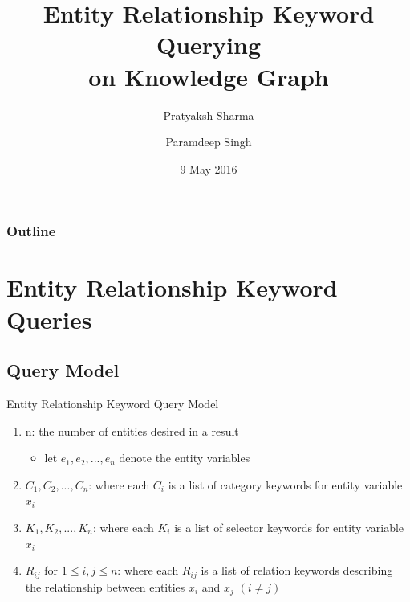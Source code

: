\documentclass[pdf,11pt]{beamer}
\author[Pratyaksh \and Paramdeep]{Pratyaksh Sharma \and Paramdeep Singh}
\title[Keyword Querying]{Entity Relationship Keyword Querying \\ on Knowledge Graph}
\date{9 May 2016}
\begin{document}
\begin{frame}
  \titlepage
\end{frame}

\begin{frame}
  \frametitle{Outline}
    \tableofcontents[hideallsubsections]
\end{frame}



\section[ER Keyword Querying]{Entity Relationship Keyword Queries}

\begin{frame}
\end{frame}


\subsection{Query Model}


\begin{frame}{Entity Relationship Keyword Query Model}

\begin{enumerate}
  \item<2-> n: the number of entities desired in a result
  \begin{itemize}
    \item<3-> let $e_1, e_2, ..., e_n$ denote the entity variables
  \end{itemize}
  \item<4-> $C_1, C_2, ..., C_n$: where each $C_i$ is a list of category keywords for entity variable $x_i$
  \item<5-> $K_1, K_2, ..., K_n$: where each $K_i$ is a list of selector keywords for entity variable $x_i$
  \item<6-> $R_{ij}$ for $1 \le i, j \le n$: where each $R_{ij}$ is a list of relation keywords describing the relationship between entities $x_i$ and $x_j$ $(i \ne j)$
\end{enumerate}

\end{frame}


\end{document}
